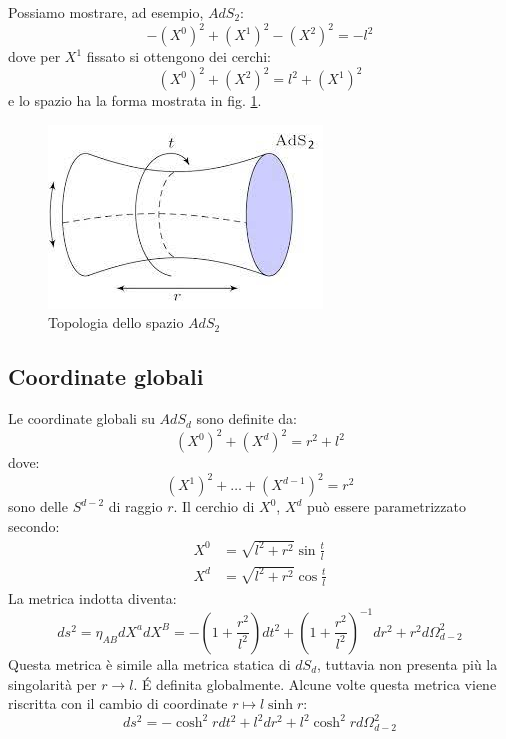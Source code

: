 Possiamo mostrare, ad esempio, $AdS_2$:
\begin{equation*}
    -(X^0)^2 + (X^1)^2 - (X^2)^2 = - l^2
\end{equation*}
dove per $X^1$ fissato si ottengono dei cerchi:
\begin{equation*}
       (X^0)^2 +  (X^2)^2 =  l^2 + (X^1)^2 
\end{equation*}
e lo spazio ha la forma mostrata in fig. \ref{fig.spazio_antidesitter}.
\begin{figure}
    \centering
    \includegraphics[scale=0.8]{immagini/spazio_antidesitter.jpeg}
    \caption{Topologia dello spazio $AdS_2$}
    \label{fig.spazio_antidesitter}
\end{figure}
\subsection{Coordinate globali}
Le coordinate globali su $AdS_d$ sono definite da:
\begin{equation*}
    (X^0)^2 + (X^d)^2 = r^2 + l^2 
\end{equation*}
dove:
\begin{equation*}
    (X^1)^2 + \dots + (X^{d-1})^2 = r^2
\end{equation*}
sono delle $S^{d-2}$ di raggio $r$. Il cerchio di $X^0$, $X^d$ può essere parametrizzato secondo:
\begin{align*}
    X^0 &= \sqrt{l^2 + r^2} \sin \frac{t}{l} \\
    X^d &= \sqrt{l^2 + r^2} \cos \frac{t}{l}
\end{align*}
La metrica indotta diventa:
\begin{equation}
    ds^2 = \eta_{AB}dX^a dX^B = - \left( 1 + \frac{r^2}{l^2}\right)dt^2 + \left( 1 + \frac{r^2}{l^2}\right)^{-1}dr^2 + r^2 d\Omega_{d-2}^2
    \label{eq.metrica_ads_statica}
\end{equation}
Questa metrica è simile alla metrica statica di $dS_d$, tuttavia non presenta più la singolarità per $r\rightarrow l$. \'E definita globalmente. Alcune volte questa metrica viene riscritta con il cambio di coordinate $r \mapsto l\sinh r$:
\begin{equation}
    ds^2 = -\cosh^2r dt^2 + l^2dr^2 + l^2\cosh^2r d\Omega_{d-2}^2
\end{equation}
